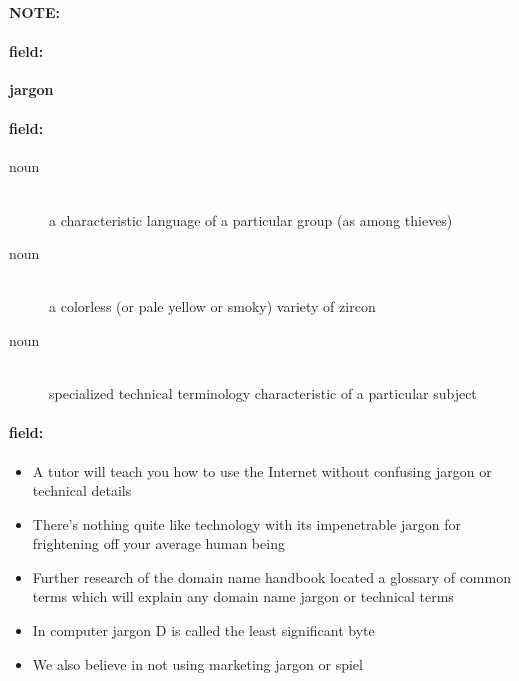 \documentclass[12pt]{article}
\newenvironment{note}{\paragraph{NOTE:}}{}
\newenvironment{field}{\paragraph{field:}}{}
\begin{document}
\begin{note}
\begin{field}
\textbf{\large jargon}
\end{field}


\begin{field}
\begin{description}
\item[noun] \hfill \\ 
a characteristic language of a particular group (as among thieves)

\item[noun] \hfill \\ 
a colorless (or pale yellow or smoky) variety of zircon

\item[noun] \hfill \\ 
specialized technical terminology characteristic of a particular subject

\end{description}
\end{field}

\begin{field}
\begin{itemize}
\item A tutor will teach you how to use the Internet without confusing jargon or technical details
\item There's nothing quite like technology with its impenetrable jargon for frightening off your average human being
\item Further research of the domain name handbook located a glossary of common terms which will explain any domain name jargon or technical terms
\item In computer jargon D is called the least significant byte
\item We also believe in not using marketing jargon or spiel
\end{itemize}
\end{field}
\end{note}
\end{document}
